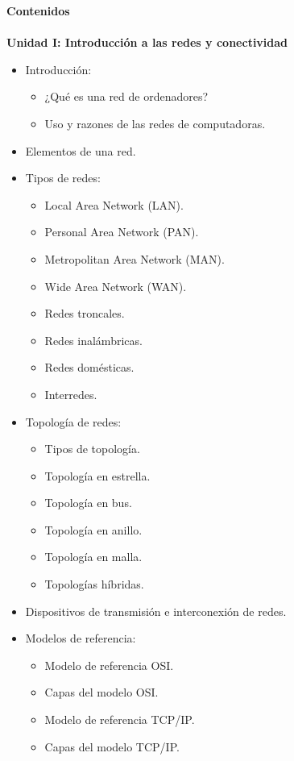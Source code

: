 \large\textbf{Contenidos}\\\\
\textbf{Unidad I: Introducción a las redes y conectividad}
\begin{itemize}
	\item Introducción:
	      \begin{itemize}
		      \item ¿Qué es una red de ordenadores?
		      \item Uso y razones de las redes de computadoras.
	      \end{itemize}
	\item Elementos de una red.
	\item Tipos de redes:
	      \begin{itemize}
		      \item Local Area Network (LAN).
		      \item Personal Area Network (PAN).
		      \item Metropolitan Area Network (MAN).
		      \item Wide Area Network (WAN).
		      \item Redes troncales.
		      \item Redes inalámbricas.
		      \item Redes domésticas.
		      \item Interredes.
	      \end{itemize}
	\item Topología de redes:
	      \begin{itemize}
		      \item Tipos de topología.
		      \item Topología en estrella.
		      \item Topología en bus.
		      \item Topología en anillo.
		      \item Topología en malla.
		      \item Topologías híbridas.
	      \end{itemize}
	\item Dispositivos de transmisión e interconexión de redes.
	\item Modelos de referencia:
	      \begin{itemize}
		      \item Modelo de referencia OSI.
		      \item Capas del modelo OSI.
		      \item Modelo de referencia TCP/IP.
		      \item Capas del modelo TCP/IP.

\end{itemize}
\end{itemize}
